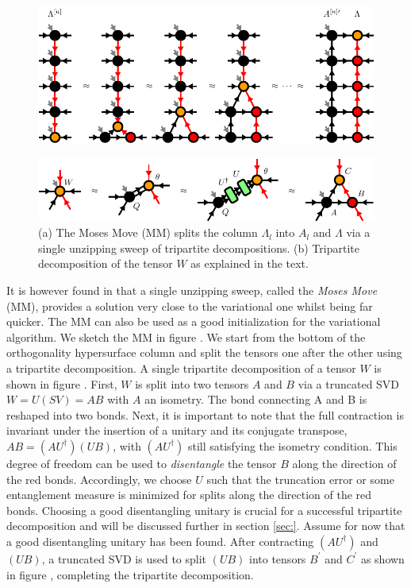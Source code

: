 \begin{figure}
	\centering
	\subcaptionbox{\label{fig:Moses_move}}
	{%
		\includegraphics[scale=1]{figures/tikz/Tensor_Networks/isoTPS_MM/isoTPS_MM_a.pdf}
	}
	\subcaptionbox{\label{fig:tripartite_decomposition}}
	{%
		\includegraphics[scale=1]{figures/tikz/Tensor_Networks/isoTPS_MM/isoTPS_MM_b.pdf}
		
	}
	\caption{(a) The Moses Move (MM) splits the column $\Lambda_l$ into $A_l$ and $\Lambda$ via a single unzipping sweep of tripartite decompositions. (b) Tripartite decomposition of the tensor $W$ as explained in the text.}
	\label{fig:Moses_move_and_tripartite_decomposition}
\end{figure}
It is however found in \cite{cite:isometric_tensor_network_states_in_two_dimensions} that a single unzipping sweep, called the \textit{Moses Move} (MM), provides a solution very close to the variational one whilst being far quicker. The MM can also be used as a good initialization for the variational algorithm. We sketch the MM in figure . We start from the bottom of the orthogonality hypersurface column and split the tensors one after the other using a tripartite decomposition. A single tripartite decomposition of a tensor $W$ is shown in figure . First, $W$ is split into two tensors $A$ and $B$ via a truncated SVD $W = U(SV) = AB$ with $A$ an isometry. The bond connecting A and B is reshaped into two bonds. Next, it is important to note that the full contraction is invariant under the insertion of a unitary and its conjugate transpose, $AB = (AU^\dagger)(UB)$, with $(AU^\dagger)$ still satisfying the isometry condition. This degree of freedom can be used to \textit{disentangle} the tensor $B$ along the direction of the red bonds. Accordingly, we choose $U$ such that the truncation error or some entanglement measure is minimized for splits along the direction of the red bonds. Choosing a good disentangling unitary is crucial for a successful tripartite decomposition and will be discussed further in section \ref{sec:}. Assume for now that a good disentangling unitary has been found. After contracting $(AU^\dagger)$ and $(UB)$, a truncated SVD is used to split $(UB)$ into tensors $B^\prime$ and $C^\prime$ as shown in figure , completing the tripartite decomposition. \par

